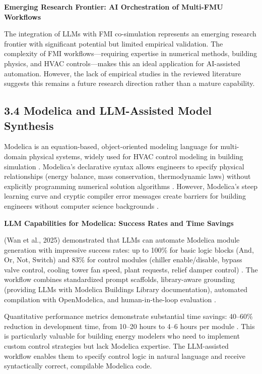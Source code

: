 \documentclass[12pt,a4paper]{article}
\begin{document}
\textbf{Emerging Research Frontier: AI Orchestration of Multi-FMU Workflows}

The integration of LLMs with FMI co-simulation represents an emerging research frontier with significant potential but limited empirical validation. The complexity of FMI workflows---requiring expertise in numerical methods, building physics, and HVAC controls---makes this an ideal application for AI-assisted automation. However, the lack of empirical studies in the reviewed literature suggests this remains a future research direction rather than a mature capability.

\subsection{3.4 Modelica and LLM-Assisted Model Synthesis}

Modelica is an equation-based, object-oriented modeling language for multi-domain physical systems, widely used for HVAC control modeling in building simulation \cite{ref90}. Modelica's declarative syntax allows engineers to specify physical relationships (energy balance, mass conservation, thermodynamic laws) without explicitly programming numerical solution algorithms \cite{ref91}. However, Modelica's steep learning curve and cryptic compiler error messages create barriers for building engineers without computer science backgrounds \cite{ref92}.

\textbf{LLM Capabilities for Modelica: Success Rates and Time Savings}

(Wan et al., 2025) demonstrated that LLMs can automate Modelica module generation with impressive success rates: up to 100\% for basic logic blocks (And, Or, Not, Switch) and 83\% for control modules (chiller enable/disable, bypass valve control, cooling tower fan speed, plant requests, relief damper control) \cite{ref93}. The workflow combines standardized prompt scaffolds, library-aware grounding (providing LLMs with Modelica Buildings Library documentation), automated compilation with OpenModelica, and human-in-the-loop evaluation \cite{ref94}.

Quantitative performance metrics demonstrate substantial time savings: 40--60\% reduction in development time, from 10--20 hours to 4--6 hours per module \cite{ref95}. This is particularly valuable for building energy modelers who need to implement custom control strategies but lack Modelica expertise. The LLM-assisted workflow enables them to specify control logic in natural language and receive syntactically correct, compilable Modelica code.
\end{document}
